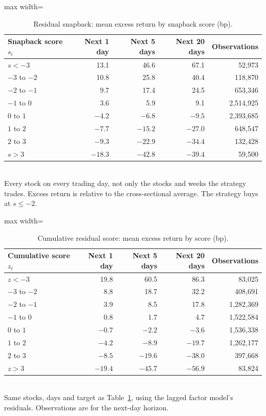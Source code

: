 \documentclass[11pt,letterpaper]{article}
\begin{document}
\begin{table}[!htbp]
\centering
\caption{Residual snapback: mean excess return by snapback score (bp).}
\label{tab:calibration-snap}
\begin{adjustbox}{max width=\linewidth}
\begin{tabular}{lrrrr}
\toprule
Snapback score $s_i$ & Next 1 day & Next 5 days & Next 20 days & Observations \\
\midrule
$s < -3$ & 13.1 & 46.6 & 67.1 & 52,973 \\
$-3$ to $-2$ & 10.8 & 25.8 & 40.4 & 118,870 \\
$-2$ to $-1$ & 9.7 & 17.4 & 24.5 & 653,346 \\
$-1$ to $0$ & 3.6 & 5.9 & 9.1 & 2,514,925 \\
$0$ to $1$ & $-4.2$ & $-6.8$ & $-9.5$ & 2,393,685 \\
$1$ to $2$ & $-7.7$ & $-15.2$ & $-27.0$ & 648,547 \\
$2$ to $3$ & $-9.3$ & $-22.9$ & $-34.4$ & 132,428 \\
$s > 3$ & $-18.3$ & $-42.8$ & $-39.4$ & 59,500 \\
\bottomrule
\end{tabular}
\end{adjustbox}
\\[4pt]
\small Every stock on every trading day, not only the stocks and weeks the strategy trades. Excess return is relative to the cross-sectional average. The strategy buys at $s \le -2$.
\end{table}

\begin{table}[!htbp]
\centering
\caption{Cumulative residual score: mean excess return by score (bp).}
\label{tab:calibration-cumulative}
\begin{adjustbox}{max width=\linewidth}
\begin{tabular}{lrrrr}
\toprule
Cumulative score $z_i$ & Next 1 day & Next 5 days & Next 20 days & Observations \\
\midrule
$z < -3$ & 19.8 & 60.5 & 86.3 & 83,025 \\
$-3$ to $-2$ & 8.8 & 18.7 & 32.2 & 408,691 \\
$-2$ to $-1$ & 3.9 & 8.5 & 17.8 & 1,282,369 \\
$-1$ to $0$ & 0.8 & 1.7 & 4.7 & 1,522,584 \\
$0$ to $1$ & $-0.7$ & $-2.2$ & $-3.6$ & 1,536,338 \\
$1$ to $2$ & $-4.2$ & $-8.9$ & $-19.7$ & 1,262,177 \\
$2$ to $3$ & $-8.5$ & $-19.6$ & $-38.0$ & 397,668 \\
$z > 3$ & $-19.4$ & $-45.7$ & $-56.9$ & 83,824 \\
\bottomrule
\end{tabular}
\end{adjustbox}
\\[4pt]
\small Same stocks, days and target as Table~\ref{tab:calibration-snap}, using the lagged factor model's residuals. Observations are for the next-day horizon.
\end{table}
\end{document}
